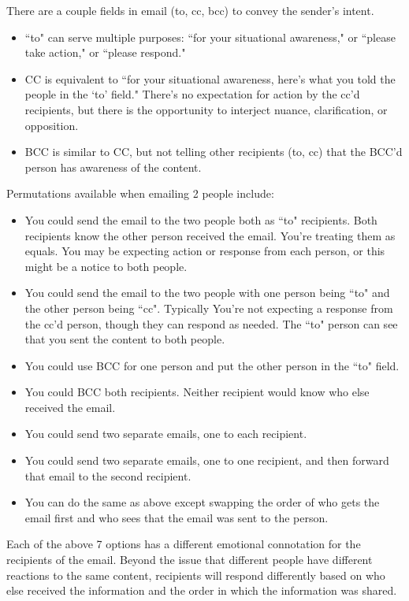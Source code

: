 There are a couple fields in email (to, cc, bcc) to convey the sender's intent. 
\begin{itemize}
\item ``to" can serve multiple purposes: ``for your situational awareness," or ``please take action," or ``please respond."
\item CC is equivalent to ``for your situational awareness, here's what you told the people in the `to' field." There's no expectation for action by the cc'd recipients, but there is the opportunity to interject nuance, clarification, or opposition.
\item BCC is similar to CC, but not telling other recipients (to, cc) that the BCC'd person has awareness of the content.
\end{itemize}
Permutations available when emailing 2 people include:
\begin{itemize}
\item You could send the email to the two people both as ``to" recipients. Both recipients know the other person received the email. You're treating them as equals. You may be expecting action or response from each person, or this might be a notice to both people.
\item You could send the email to the two people with one person being ``to" and the other person being ``cc". Typically You're not expecting a response from the cc'd person, though they can respond as needed. The ``to" person can see that you sent the content to both people.
\item You could use BCC for one person and put the other person in the ``to" field.
\item You could BCC both recipients. Neither recipient would know who else received the email.
\item You could send two separate emails, one to each recipient.
\item You could send two separate emails, one to one recipient, and then forward that email to the second recipient.
\item You can do the same as above except swapping the order of who gets the email first and who sees that the email was sent to the person.
\end{itemize}
Each of the above 7 options has a different emotional connotation for the recipients of the email. Beyond the issue that different people have different reactions to the same content, recipients will respond differently based on who else received the information and the order in which the information was shared.

